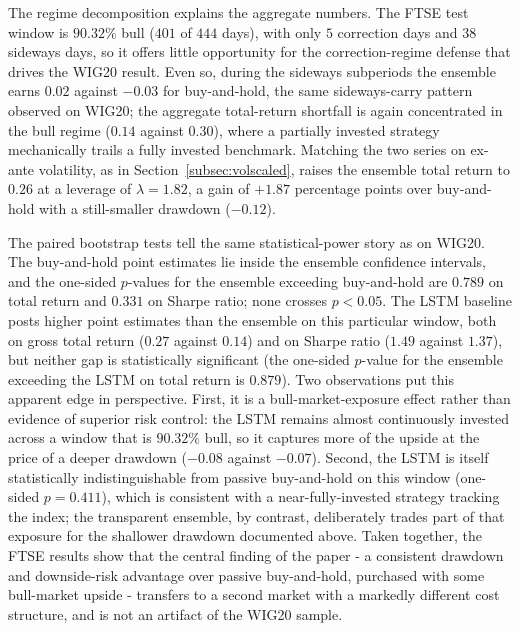 \documentclass{ieeeaccess}
\newcommand{\FtseOOSDays}{\ensuremath{444}}
\newcommand{\FtseTRtest}{\ensuremath{0.14}}
\newcommand{\FtseMDD}{\ensuremath{-0.07}}
\newcommand{\FtseSharpe}{\ensuremath{1.37}}
\newcommand{\FtsePvsBH}{\ensuremath{0.789}}
\newcommand{\FtsePvsBHsharpe}{\ensuremath{0.331}}
\newcommand{\FtseLeverage}{\ensuremath{1.82}}
\newcommand{\FtseVolScaledTR}{\ensuremath{0.26}}
\newcommand{\FtseVolScaledMDD}{\ensuremath{-0.12}}
\newcommand{\FtseVolScaledExcessPP}{\ensuremath{+1.87}}
\newcommand{\FtseRegBullShare}{90.32\%}
\newcommand{\FtseRegBullDays}{\ensuremath{401}}
\newcommand{\FtseRegCorrectionDays}{\ensuremath{5}}
\newcommand{\FtseRegSidewaysDays}{\ensuremath{38}}
\newcommand{\FtseEnsBullTR}{\ensuremath{0.14}}
\newcommand{\FtseBHBullTR}{\ensuremath{0.30}}
\newcommand{\FtseEnsSidewaysTR}{\ensuremath{0.02}}
\newcommand{\FtseBHSidewaysTR}{\ensuremath{-0.03}}
\newcommand{\FtseLSTMtest}{\ensuremath{0.27}}
\newcommand{\FtseLSTMsharpe}{\ensuremath{1.49}}
\newcommand{\FtseLSTMmdd}{\ensuremath{-0.08}}
\newcommand{\FtsePensVsLSTM}{\ensuremath{0.879}}
\newcommand{\FtsePLSTMvsBH}{\ensuremath{0.411}}
\begin{document}
The regime decomposition explains the aggregate numbers. The FTSE test window is $\FtseRegBullShare{}$ bull ($\FtseRegBullDays{}$ of \FtseOOSDays{} days), with only $\FtseRegCorrectionDays{}$ correction days and $\FtseRegSidewaysDays{}$ sideways days, so it offers little opportunity for the correction-regime defense that drives the WIG20 result. Even so, during the sideways subperiods the ensemble earns \FtseEnsSidewaysTR{} against \FtseBHSidewaysTR{} for buy-and-hold, the same sideways-carry pattern observed on WIG20; the aggregate total-return shortfall is again concentrated in the bull regime (\FtseEnsBullTR{} against \FtseBHBullTR{}), where a partially invested strategy mechanically trails a fully invested benchmark. Matching the two series on ex-ante volatility, as in Section~\ref{subsec:volscaled}, raises the ensemble total return to \FtseVolScaledTR{} at a leverage of $\lambda = \FtseLeverage{}$, a gain of \FtseVolScaledExcessPP{} percentage points over buy-and-hold with a still-smaller drawdown (\FtseVolScaledMDD{}).

The paired bootstrap tests tell the same statistical-power story as on WIG20. The buy-and-hold point estimates lie inside the ensemble confidence intervals, and the one-sided $p$-values for the ensemble exceeding buy-and-hold are \FtsePvsBH{} on total return and \FtsePvsBHsharpe{} on Sharpe ratio; none crosses $p < 0.05$. The LSTM baseline posts higher point estimates than the ensemble on this particular window, both on gross total return (\FtseLSTMtest{} against \FtseTRtest{}) and on Sharpe ratio (\FtseLSTMsharpe{} against \FtseSharpe{}), but neither gap is statistically significant (the one-sided $p$-value for the ensemble exceeding the LSTM on total return is \FtsePensVsLSTM{}). Two observations put this apparent edge in perspective. First, it is a bull-market-exposure effect rather than evidence of superior risk control: the LSTM remains almost continuously invested across a window that is $\FtseRegBullShare{}$ bull, so it captures more of the upside at the price of a deeper drawdown (\FtseLSTMmdd{} against \FtseMDD{}). Second, the LSTM is itself statistically indistinguishable from passive buy-and-hold on this window (one-sided $p = \FtsePLSTMvsBH{}$), which is consistent with a near-fully-invested strategy tracking the index; the transparent ensemble, by contrast, deliberately trades part of that exposure for the shallower drawdown documented above. Taken together, the FTSE results show that the central finding of the paper - a consistent drawdown and downside-risk advantage over passive buy-and-hold, purchased with some bull-market upside - transfers to a second market with a markedly different cost structure, and is not an artifact of the WIG20 sample.
\end{document}
